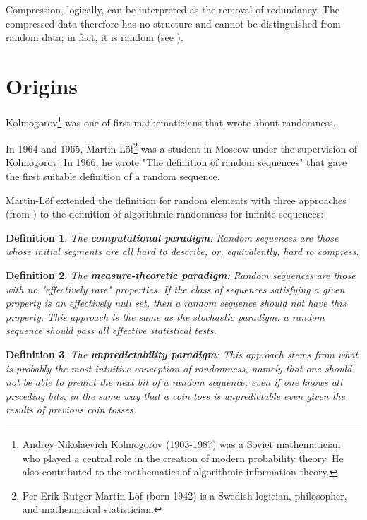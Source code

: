 \documentclass[12pt, a4paper]{report}
\newtheorem{definition}{Definition}[section] %
\begin{document}
Compression, logically, can be interpreted as the removal of redundancy.
The compressed data therefore has no structure and cannot be distinguished from random data; in fact, it is random
(see \cite{AConciseIntroductionToDataCompression}).

\section{Origins}

Kolmogorov\footnote{Andrey Nikolaevich Kolmogorov (1903-1987) was a Soviet mathematician who played a central role in the creation
of modern probability theory. He also contributed to the mathematics of algorithmic information theory.} was one of first
mathematicians that wrote about randomness.

In 1964 and 1965, Martin-Löf\footnote{Per Erik Rutger Martin-Löf (born 1942) is a Swedish logician, philosopher, and mathematical
statistician.} was a student in Moscow under the supervision of Kolmogorov.
In 1966, he wrote "The definition of random sequences" that gave the first suitable definition of a random sequence.

Martin-Löf extended the definition for random elements with three approaches (from \cite{AlgorithmicRandomnessAndComplexity}) to
the definition of algorithmic randomness for infinite sequences:

\begin{definition}
The \textbf{computational paradigm}: Random sequences are those whose initial segments are all hard  to describe, or,
equivalently, hard to compress.
\end{definition}

\begin{definition}
The \textbf{measure-theoretic paradigm}: Random sequences  are those with no "effectively rare" properties.
If the class of sequences satisfying a given property is an effectively null set, then a random sequence should not have this
property.
This approach is the same as the stochastic paradigm: a random sequence should pass all effective statistical tests.
\end{definition}

\begin{definition}
The \textbf{unpredictability paradigm}: This approach stems from what is probably the most intuitive conception of randomness,
namely that one should not be able to predict the next bit of a random sequence, even if one knows all preceding bits, in the same
way that a coin toss is unpredictable even given the results of previous coin tosses.
\end{definition}
\end{document}
